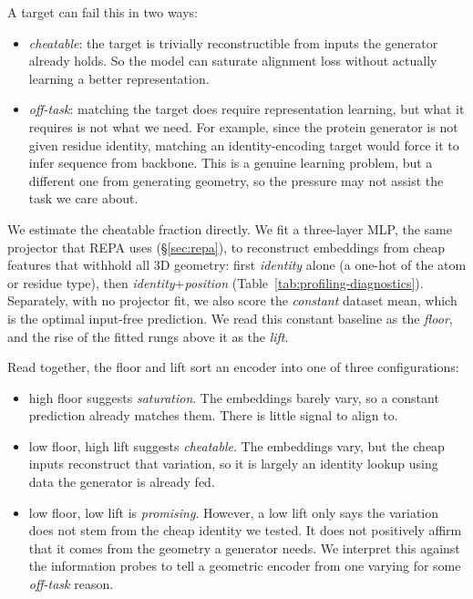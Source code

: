 \documentclass[12pt,a4paper,twoside]{report}
\begin{document}
A target can fail this in two ways:
\begin{itemize}[topsep=2pt,itemsep=1pt]
  \item \emph{cheatable}: the target is trivially reconstructible from inputs the generator already holds. So the model can saturate alignment loss without actually learning a better representation.
  \item \emph{off-task}: matching the target does require representation learning, but what it requires is not what we need. For example, since the protein generator is not given residue identity, matching an identity-encoding target would force it to infer sequence from backbone. This is a genuine learning problem, but a different one from generating geometry, so the pressure may not assist the task we care about.
\end{itemize}

We estimate the cheatable fraction directly. We fit a three-layer MLP, the same projector that REPA uses (\S\ref{sec:repa}), to reconstruct embeddings from cheap features that withhold all 3D geometry: first \emph{identity} alone (a one-hot of the atom or residue type), then \emph{identity${+}$position} (Table~\ref{tab:profiling-diagnostics}). Separately, with no projector fit, we also score the \emph{constant} dataset mean, which is the optimal input-free prediction. We read this constant baseline as the \emph{floor}, and the rise of the fitted rungs above it as the \emph{lift}.

Read together, the floor and lift sort an encoder into one of three configurations:
\begin{itemize}[topsep=2pt,itemsep=1pt]
  \item high floor suggests \emph{saturation}. The embeddings barely vary, so a constant prediction already matches them. There is little signal to align to.
  \item low floor, high lift suggests \emph{cheatable}. The embeddings vary, but the cheap inputs reconstruct that variation, so it is largely an identity lookup using data the generator is already fed.
  \item low floor, low lift is \emph{promising}. However, a low lift only says the variation does not stem from the cheap identity we tested. It does not positively affirm that it comes from the geometry a generator needs. We interpret this against the information probes to tell a geometric encoder from one varying for some \emph{off-task} reason.
\end{itemize}
\end{document}
